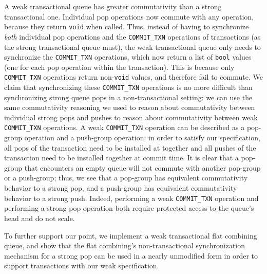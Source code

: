 A weak transactional queue has greater commutativity than a strong transactional one. Individual pop operations now commute with any operation, because they return \texttt{void} when called. Thus, instead of having to synchronize \emph{both} individual pop operations and the \texttt{COMMIT\_TXN} operations of transactions (as the strong transactional queue must), the weak transactional queue only needs to synchronize the \texttt{COMMIT\_TXN} operations, which now return a list of \texttt{bool} values (one for each pop operation within the transaction). This is because only \texttt{COMMIT\_TXN} operations return non-\texttt{void} values, and therefore fail to commute.
We claim that synchronizing these \texttt{COMMIT\_TXN} operations is no more difficult than synchronizing strong queue pops in a non-transactional setting: we can use the same commutativity reasoning we used to reason about commutativity between individual strong pops and pushes to reason about commutativity between weak \texttt{COMMIT\_TXN} operations. A weak \texttt{COMMIT\_TXN} operation can be described as a pop-group operation and a push-group operation: in order to satisfy our specification, all pops of the transaction need to be installed at together and all pushes of the transaction need to be installed together at commit time. It is clear that a pop-group that encounters an empty queue will not commute with another pop-group or a push-group; thus, we see that a pop-group has equivalent commutativity behavior to a strong pop, and a push-group has equivalent commutativity behavior to a strong push. Indeed, performing a weak \texttt{COMMIT\_TXN} operation and performing a strong pop operation both require protected access to the queue's head and do not scale.

To further support our point, we implement a weak transactional flat combining queue, and show that the flat combining's non-transactional synchronization mechanism for a strong pop can be used in a nearly unmodified form in order to support transactions with our weak specification.


